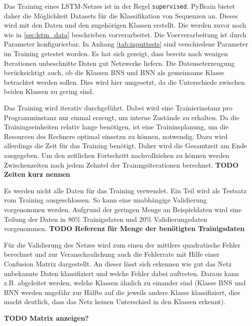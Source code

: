 Das Training eines \ac{LSTM}-Netzes ist in der Regel \texttt{supervised}.
PyBrain bietet daher die Möglichkeit Datasets für die Klassifikation von
Sequenzen an. Dieses wird mit den Daten und den zugehörigen Klassen erstellt.
Die werden zuvor noch wie in \autoref{sec:lstm_data} beschrieben vorverarbeitet.
Die Voerverarbeitung ist durch Parameter konfigurierbar. In Anhang
\autoref{tab:inputtests} sind verschiedene Parameter im Training getestet
worden. Es hat sich gezeigt, dass bereits nach wenigen Iterationen unbeschnitte
Daten gut Netzwerke liefern. Die Datenseterzeugung berücksichtigt auch, ob die
Klassen \ac{BNS} und \ac{BNN} als gemeinsame Klasse betrachtet werden sollen.
Dies wird hier umgesetzt, da die Unterschiede zwischen beiden Klassen zu gering
sind. 

Das Training wird iterativ durchgeführt. Dabei wird eine Trainierinstanz pro
Programminstanz nur einmal erzeugt, um interne Zustände zu erhalten. Da die
Trainingseinheiten relativ lange benötigen, ist eine Traininsplanung, um die
Resourcen des Rechners optimal einsetzn zu können, notwendig. Dazu wird
allerdings die Zeit für das Training benötigt. Daher wird die Gesamtzeit am Ende
ausgegeben. Um den zeitlichen Fortschritt nachvollziehen zu können werden
Zwischenzeiten nach jedem Zehntel der Trainngsiterationen berechnet.
\textbf{TODO Zeiten kurz nennen}

Es werden nicht alle Daten für das Training verwendet. Ein Teil wird als
Testsatz vom Training ausgeschlossen. So kann eine unabhängige Validierung
vorgenommen werden. Aufgrund der geringen Menge an Beispieldaten wird eine
Teilung der Daten in 80\% Trainigsdaten und 20\% Validierungsdaten vorgenommen.
\textbf{TODO Referenz für Menge der benötigten Trainigsdaten}

Für die Validierung des Netzes wird zum einen der mittlere quadratische Fehler
berechnet und zur Veranschaulichung auch die Fehlerrate mit Hilfe einer
Confusion Matrix dargestellt. An dieser lässt sich erkennen wie gut das Netz
unbekannte Daten klassifiziert und welche Fehler dabei auftreten. Daraus kann
z.B.
abgeleitet werden, welche Klassen ähnlich zu einander sind (Klasse \ac{BNS} und
\ac{BNN} werden ungefähr zur Hälfte auf die jeweils andere Klasse klassifiziert,
dies macht deutlich, dass das Netz keinen Unterschied in den Klassen erkennt).

\textbf{TODO Matrix anzeigen?}

